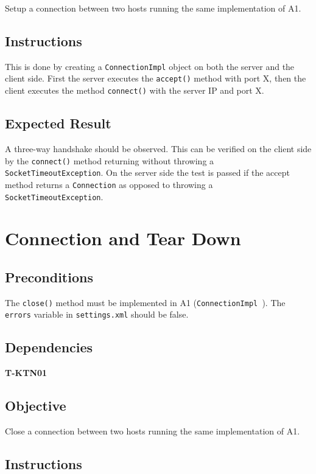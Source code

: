 \documentclass{article}
\begin{document}
Setup a connection between two hosts running the same implementation of A1. 

\subsection{Instructions}

This is done by creating a \texttt{ConnectionImpl} object on both the server
and the client side. First the server executes the \texttt{accept()} method
with port X, then the client executes the method \texttt{connect()} with the
server IP and port X.

\subsection{Expected Result}

A three-way handshake should be observed. This can be verified on the client
side by the \texttt{connect()} method returning without throwing a \texttt{%
SocketTimeoutException}. On the server side the test is passed if the accept
method returns a \texttt{Connection} as opposed to throwing a \texttt{%
SocketTimeoutException}.

\section{Connection and Tear Down}

\subsection{Preconditions}

The \texttt{close()} method must be implemented in A1 (\texttt{ConnectionImpl%
}). The \texttt{errors} variable in \texttt{settings.xml} should be false.

\subsection{Dependencies}

\textbf{T-KTN01}

\subsection{Objective}

Close a connection between two hosts running the same implementation of A1.

\subsection{Instructions}
\end{document}
